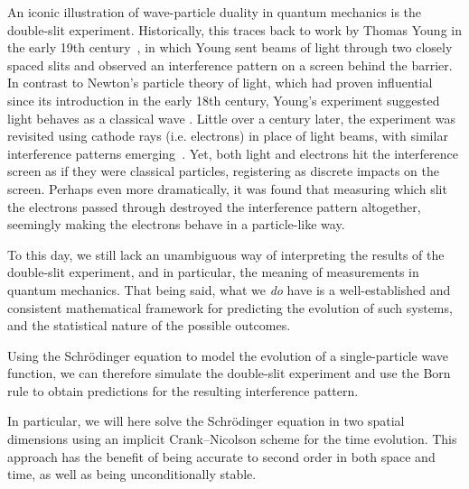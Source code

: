 \documentclass[aps,pra,reprint,amsmath,amssymb,twocolumn,preprintnumbers,superscriptaddress,10pt]{revtex4-2}
\begin{document}
An iconic illustration of wave-particle duality in quantum mechanics is the double-slit experiment.
Historically, this traces back to work by Thomas Young in the early 19th century~\cite{Young1804}, in which Young sent beams of light through two closely spaced slits and observed an interference pattern on a screen behind the barrier. 
In contrast to Newton's particle theory of light, which had proven influential since its introduction in the early 18th century, Young's experiment suggested light behaves as a classical wave \cite{sottie2025}. %
Little over a century later, the experiment was revisited using cathode rays (i.e. electrons) in place of light beams, with similar interference patterns emerging~\cite{thomson1927}.
Yet, both light and electrons hit the interference screen as if they were classical particles, registering as discrete impacts on the screen.
Perhaps even more dramatically, it was found that measuring which slit the electrons passed through destroyed the interference pattern altogether, seemingly making the electrons behave in a particle-like way.

To this day, we still lack an unambiguous way of interpreting the results of the double-slit experiment, and in particular, the meaning of measurements in quantum mechanics.
That being said, what we \textit{do} have is a well-established and consistent mathematical framework for predicting the evolution of such systems, and the statistical nature of the possible outcomes.

Using the Schr\"odinger equation to model the evolution of a single-particle wave function, we can therefore simulate the double-slit experiment and use the Born rule to obtain predictions for the resulting interference pattern.

In particular, we will here solve the Schr\"odinger equation in two spatial dimensions using an implicit Crank--Nicolson scheme for the time evolution.
This approach has the benefit of being accurate to second order in both space and time, as well as being unconditionally stable.
\end{document}
